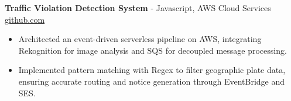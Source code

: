 \documentclass[11pt]{article}       %
\begin{document}

\textbf{Traffic Violation Detection System}{ - Javascript, AWS Cloud Services} \hfill \href{https://github.com/Monica20030707/AWS_rekonigition-N-read-database}{github.com} \\
\vspace{-9pt}
\begin{itemize}
  \item Architected an event-driven serverless pipeline on AWS, integrating Rekognition for image analysis and SQS for decoupled message processing.
  \item Implemented pattern matching with Regex to filter geographic plate data, ensuring accurate routing and notice generation through EventBridge and SES.
\end{itemize}

\end{document}
